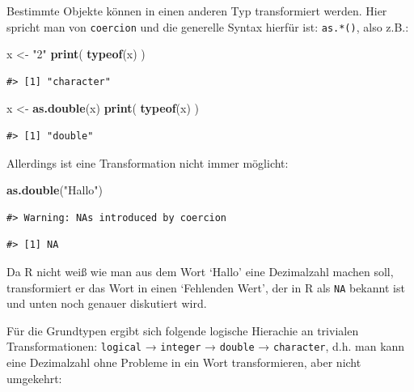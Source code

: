 \documentclass[]{book}
\newenvironment{Shaded}{\begin{snugshade}}{\end{snugshade}}
\newcommand{\KeywordTok}[1]{\textcolor[rgb]{0.13,0.29,0.53}{\textbf{#1}}}
\newcommand{\StringTok}[1]{\textcolor[rgb]{0.31,0.60,0.02}{#1}}
\newcommand{\NormalTok}[1]{#1}
\begin{document}
Bestimmte Objekte können in einen anderen Typ transformiert werden. Hier
spricht man von \texttt{coercion} und die generelle Syntax hierfür ist:
\texttt{as.*()}, also z.B.:

\begin{Shaded}
\begin{Highlighting}[]
\NormalTok{x <-}\StringTok{ "2"}
\KeywordTok{print}\NormalTok{(}
  \KeywordTok{typeof}\NormalTok{(x)}
\NormalTok{)}
\end{Highlighting}
\end{Shaded}

\begin{verbatim}
#> [1] "character"
\end{verbatim}

\begin{Shaded}
\begin{Highlighting}[]
\NormalTok{x <-}\StringTok{ }\KeywordTok{as.double}\NormalTok{(x)}
\KeywordTok{print}\NormalTok{(}
  \KeywordTok{typeof}\NormalTok{(x)}
\NormalTok{)}
\end{Highlighting}
\end{Shaded}

\begin{verbatim}
#> [1] "double"
\end{verbatim}

Allerdings ist eine Transformation nicht immer möglicht:

\begin{Shaded}
\begin{Highlighting}[]
\KeywordTok{as.double}\NormalTok{(}\StringTok{"Hallo"}\NormalTok{)}
\end{Highlighting}
\end{Shaded}

\begin{verbatim}
#> Warning: NAs introduced by coercion
\end{verbatim}

\begin{verbatim}
#> [1] NA
\end{verbatim}

Da R nicht weiß wie man aus dem Wort `Hallo' eine Dezimalzahl machen
soll, transformiert er das Wort in einen `Fehlenden Wert', der in R als
\texttt{NA} bekannt ist und unten noch genauer diskutiert wird.

Für die Grundtypen ergibt sich folgende logische Hierachie an trivialen
Transformationen: \texttt{logical} → \texttt{integer} → \texttt{double}
→ \texttt{character}, d.h. man kann eine Dezimalzahl ohne Probleme in
ein Wort transformieren, aber nicht umgekehrt:
\end{document}
